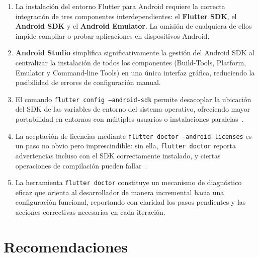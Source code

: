 \documentclass[12pt,a4paper]{article}
\begin{document}
\begin{enumerate}
  \item La instalación del entorno Flutter para Android requiere la correcta integración de tres componentes interdependientes: el \textbf{Flutter SDK}, el \textbf{Android SDK} y el \textbf{Android Emulator}. La omisión de cualquiera de ellos impide compilar o probar aplicaciones en dispositivos Android.

  \item \textbf{Android Studio} simplifica significativamente la gestión del Android SDK al centralizar la instalación de todos los componentes (Build-Tools, Platform, Emulator y Command-line Tools) en una única interfaz gráfica, reduciendo la posibilidad de errores de configuración manual.

  \item El comando \texttt{flutter config --android-sdk} permite desacoplar la ubicación del SDK de las variables de entorno del sistema operativo, ofreciendo mayor portabilidad en entornos con múltiples usuarios o instalaciones paralelas~\cite{flutter2024}.

  \item La aceptación de licencias mediante \texttt{flutter doctor --android-licenses} es un paso no obvio pero imprescindible: sin ella, \texttt{flutter doctor} reporta advertencias incluso con el SDK correctamente instalado, y ciertas operaciones de compilación pueden fallar~\cite{androiddev2024}.

  \item La herramienta \texttt{flutter doctor} constituye un mecanismo de diagnóstico eficaz que orienta al desarrollador de manera incremental hacia una configuración funcional, reportando con claridad los pasos pendientes y las acciones correctivas necesarias en cada iteración.
\end{enumerate}

\section{Recomendaciones}
\end{document}
